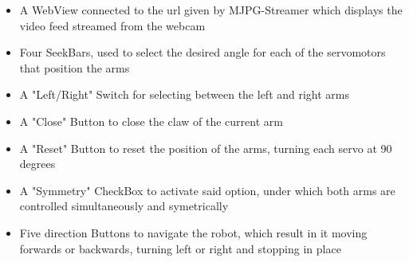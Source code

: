 	\begin{itemize}
	\item A WebView connected to the url given by MJPG-Streamer which displays the video feed streamed from the webcam

	\item Four SeekBars, used to select the desired angle for each of the servomotors that position the arms

	\item A "Left/Right" Switch for selecting between the left and right arms

	\item A "Close" Button to close the claw of the current arm

	\item A "Reset" Button to reset the position of the arms, turning each servo at 90 degrees

	\item A "Symmetry" CheckBox to activate said option, under which both arms are controlled simultaneously and symetrically

	\item Five direction Buttons to navigate the robot, which result in it moving forwards or backwards, turning left or right and stopping in place

	\end{itemize}
 

